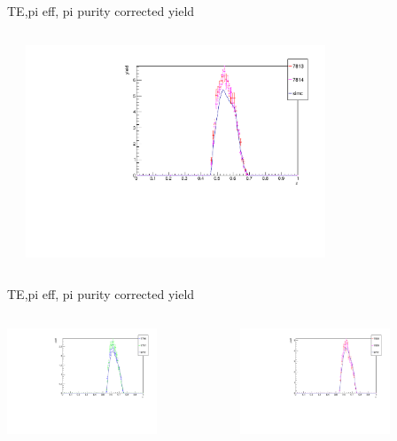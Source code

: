 \begin{frame}{TE,pi eff, pi purity corrected yield}
\begin{columns}
\begin{column}[T]{0.5\textwidth}
\end{column}
\begin{column}[T]{0.5\textwidth}
\includegraphics[width = 0.7\textwidth]{results/yield/check/yieldcheck_540_pos.pdf}
\end{column}
\end{columns}
\end{frame}
\begin{frame}{TE,pi eff, pi purity corrected yield}
\begin{columns}
\begin{column}[T]{0.5\textwidth}
\includegraphics[width = 0.7\textwidth]{results/yield/check/yieldcheck_530_neg.pdf}
\end{column}
\begin{column}[T]{0.5\textwidth}
\includegraphics[width = 0.7\textwidth]{results/yield/check/yieldcheck_530_pos.pdf}
\end{column}
\end{columns}
\end{frame}
